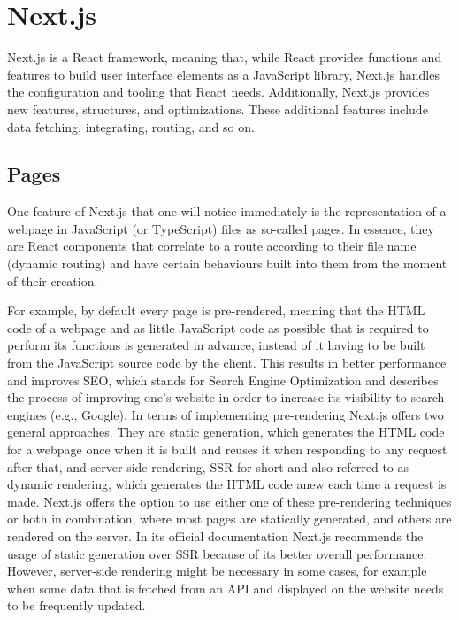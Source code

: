 \section{Next.js}
Next.js is a React framework, meaning that, while React provides functions and features to build user interface elements
as a JavaScript library, Next.js handles the configuration and tooling that React needs. Additionally, Next.js provides
new features, structures, and optimizations. These additional features include data fetching, integrating, routing,
and so on. \cite{NextjsDescription}

\subsection{Pages}
One feature of Next.js that one will notice immediately is the representation of a webpage in JavaScript (or TypeScript) files as
so-called pages. In essence, they are React components that correlate to a route according to their file name (dynamic routing) and
have certain behaviours built into them from the moment of their creation.

For example, by default every page is pre-rendered, meaning that the HTML code of a webpage and as little JavaScript code as possible
that is required to perform its functions is generated in advance, instead of it having to be built from the JavaScript source code by
the client. This results in better performance and improves SEO, which stands for Search Engine Optimization and describes the process
of improving one's website in order to increase its visibility to search engines (e.g., Google). In terms of implementing pre-rendering
Next.js offers two general approaches. They are static generation, which generates the HTML code for a webpage once when it is built
and reuses it when responding to any request after that, and server-side rendering, SSR for short and also referred to as dynamic
rendering, which generates the HTML code anew each time a request is made. Next.js offers the option to use either one of these pre-rendering
techniques or both in combination, where most pages are statically generated, and others are rendered on the server. In its official
documentation Next.js recommends the usage of static generation over SSR because of its better overall performance. However, server-side
rendering might be necessary in some cases, for example when some data that is fetched from an API and displayed on the website needs
to be frequently updated. \cite{NextjsPages}

